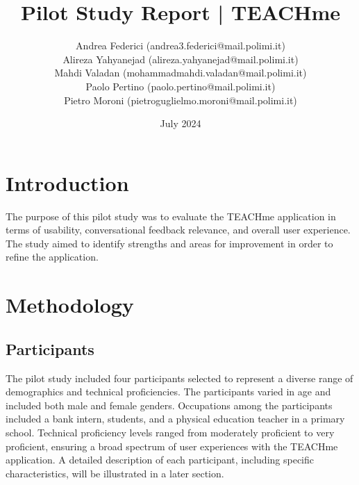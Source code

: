 \documentclass{article}
\title{Pilot Study Report | TEACHme}
\author{
    Andrea Federici (andrea3.federici@mail.polimi.it)\\
    Alireza Yahyanejad (alireza.yahyanejad@mail.polimi.it)\\
    Mahdi Valadan (mohammadmahdi.valadan@mail.polimi.it)\\
    Paolo Pertino (paolo.pertino@mail.polimi.it)\\
    Pietro Moroni (pietroguglielmo.moroni@mail.polimi.it)
}
\date{July 2024}
\begin{document}
\maketitle

\section{Introduction}
The purpose of this pilot study was to evaluate the TEACHme application in terms of usability, conversational feedback relevance, and overall user experience. The study aimed to identify strengths and areas for improvement in order to refine the application.

\section{Methodology}

\subsection{Participants}
The pilot study included four participants selected to represent a diverse range of demographics and technical proficiencies. The participants varied in age and included both male and female genders. Occupations among the participants included a bank intern, students, and a physical education teacher in a primary school. Technical proficiency levels ranged from moderately proficient to very proficient, ensuring a broad spectrum of user experiences with the TEACHme application. A detailed description of each participant, including specific characteristics, will be illustrated in a later section.
\end{document}
